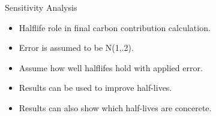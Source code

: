 \documentclass[final]{beamer}\usepackage[]{graphicx}\usepackage[]{color}
\newlength{\onecolwid}
\begin{document}
\begin{frame}[t]
\begin{columns}[t]
\begin{column}{\onecolwid} %


\begin{block}{Sensitivity Analysis}
\begin{itemize}
\item Halflife role in final carbon contribution calculation.
\item Error is assumed to be N(1,.2). 
\item Assume how well halflifes hold with applied error.
\item Results can be used to improve half-lives.
\item Results can also show which half-lives are concerete.
\end{itemize}
\vspace{0ex}

\end{block}


\end{column}
\end{columns}
\end{frame}
\end{document}
